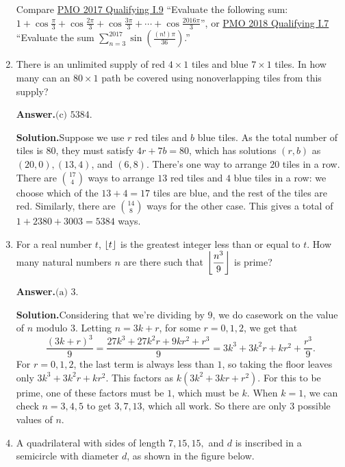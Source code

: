 \documentclass[11pt,paper=letter]{scrartcl}
\newcommand{\ans}{{\sffamily \bfseries Answer.}\;}
\newcommand{\sol}{{\sffamily \bfseries Solution.}\;}
\newcommand{\rem}[1]{{\small \sffamily \sansmath {\bfseries Remark.} #1}}
\begin{document}
\begin{enumerate}[align=left,leftmargin=*,resume]
\rem{Compare \href{http://pmo.ph/wp-content/uploads/2014/08/19th-PMO-Qualifying-Stage-Questions-and-Answers.pdf}{PMO 2017 Qualifying I.9} ``Evaluate the following sum: $1 + \cos\frac\pi3 + \cos\frac{2\pi}3 + \cos\frac{3\pi}3 + \cdots + \cos\frac{2016\pi}3$'', or \href{http://pmo.ph/wp-content/uploads/2018/08/PMO-20-Qualifying-Round-with-answers-only.pdf}{PMO 2018 Qualifying I.7} ``Evaluate the sum $\sum_{n=3}^{2017} \sin \left(\frac{(n!)\pi}{36}\right)$.''}

\item There is an unlimited supply of red $4 \times 1$ tiles and blue $7 \times 1$ tiles. In how many can an $80 \times 1$ path be covered using nonoverlapping tiles from this supply?


\ans $\boxed{\text{(c) }5384}$.

\sol Suppose we use $r$ red tiles and $b$ blue tiles. As the total number of tiles is $80$, they must satisfy $4r + 7b = 80$, which has solutions $(r, b)$ as $(20, 0), (13, 4)$, and $(6, 8)$. There's one way to arrange $20$ tiles in a row. There are $\displaystyle \binom{17}{4}$ ways to arrange $13$ red tiles and $4$ blue tiles in a row: we choose which of the $13 + 4 = 17$ tiles are blue, and the rest of the tiles are red. Similarly, there are $\displaystyle \binom{14}{8}$ ways for the other case. This gives a total of $1 + 2380 + 3003 = 5384$ ways.

\item For a real number $t$, $\left\lfloor t \right\rfloor$ is the greatest integer less than or equal to $t$. How many natural numbers $n$ are there such that $\left\lfloor \dfrac{n^3}{9} \right\rfloor$ is prime?


\ans $\boxed{\text{(a) }3}$.

\sol Considering that we're dividing by $9$, we do casework on the value of $n$ modulo $3$. Letting $n = 3k + r$, for some $r = 0, 1, 2$, we get that
\[
  \frac{(3k + r)^3}{9} = \frac{27k^3 + 27k^2r + 9kr^2 + r^3}{9} = 3k^3 + 3k^2r + kr^2 + \frac{r^3}{9}.
\]
For $r = 0, 1, 2$, the last term is always less than $1$, so taking the floor leaves only $3k^3 + 3k^2r + kr^2$. This factors as $k(3k^2 + 3kr + r^2)$. For this to be prime, one of these factors must be $1$, which must be $k$. When $k = 1$, we can check $n = 3, 4, 5$ to get $3, 7, 13$, which all work. So there are only $3$ possible values of $n$.

\item A quadrilateral with sides of length $7, 15, 15,$ and $d$ is inscribed in a semicircle with diameter $d$, as shown in the figure below.


\end{enumerate}
\end{document}
